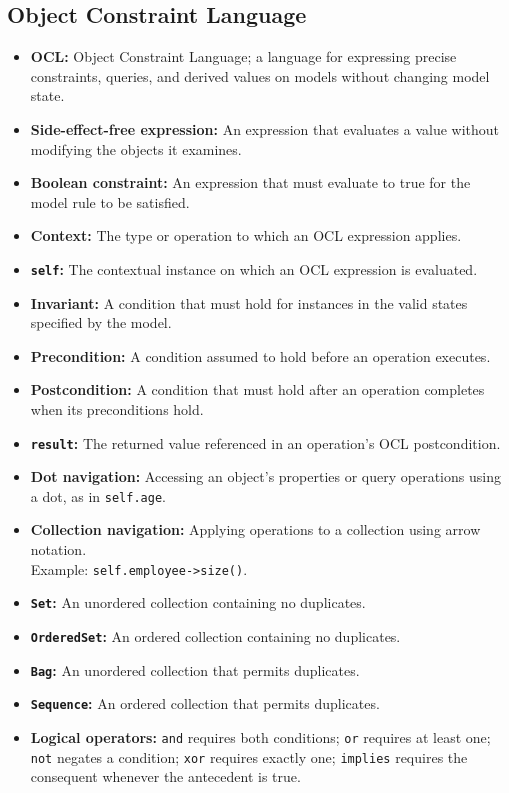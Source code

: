\documentclass[11pt]{article}
\newenvironment{DottedList}{%
  \begin{itemize}[leftmargin=2em, itemsep=0.35em, topsep=0.35em, label=\textbullet]
}{%
  \end{itemize}
}
\begin{document}
\subsection*{Object Constraint Language}
\begin{DottedList}
  \item \textbf{OCL:} Object Constraint Language; a language for expressing precise constraints, queries, and derived values on models without changing model state.
  \item \textbf{Side-effect-free expression:} An expression that evaluates a value without modifying the objects it examines.
  \item \textbf{Boolean constraint:} An expression that must evaluate to true for the model rule to be satisfied.
  \item \textbf{Context:} The type or operation to which an OCL expression applies.
  \item \textbf{\texttt{self}:} The contextual instance on which an OCL expression is evaluated.
  \item \textbf{Invariant:} A condition that must hold for instances in the valid states specified by the model.
  \item \textbf{Precondition:} A condition assumed to hold before an operation executes.
  \item \textbf{Postcondition:} A condition that must hold after an operation completes when its preconditions hold.
  \item \textbf{\texttt{result}:} The returned value referenced in an operation's OCL postcondition.
  \item \textbf{Dot navigation:} Accessing an object's properties or query operations using a dot, as in \texttt{self.age}.
  \item \textbf{Collection navigation:} Applying operations to a collection using arrow notation.\\
    Example: \texttt{self.employee->size()}.
  \item \textbf{\texttt{Set}:} An unordered collection containing no duplicates.
  \item \textbf{\texttt{OrderedSet}:} An ordered collection containing no duplicates.
  \item \textbf{\texttt{Bag}:} An unordered collection that permits duplicates.
  \item \textbf{\texttt{Sequence}:} An ordered collection that permits duplicates.
  \item \textbf{Logical operators:} \texttt{and} requires both conditions; \texttt{or} requires at least one; \texttt{not} negates a condition; \texttt{xor} requires exactly one; \texttt{implies} requires the consequent whenever the antecedent is true.

\end{DottedList}
\end{document}
